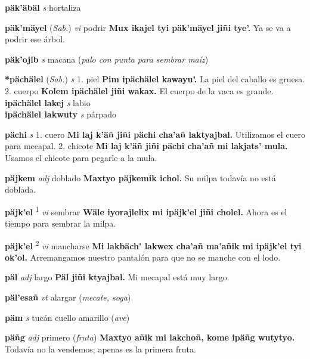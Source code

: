 \documentclass[10pt]{scrbook}
\newcommand{\entry}[1]{\textbf{#1}}
\newcommand{\onedefinition}[1]{#1.}
\newcommand{\defsuperscript}[1]{\textsuperscript{#1}}
\newcommand{\partofspeech}[1]{\textit{#1}}
\newcommand{\spanishtranslation}[1]{#1}
\newcommand{\clarification}[1]{(\textit{#1})}
\newcommand{\cholexample}[1]{\textbf{#1}}
\newcommand{\exampletranslation}[1]{#1}
\newcommand{\relevantdialect}[1]{(\textit{#1})}
\newcommand{\secondaryentry}[1]{\\\textbf{#1}}
\newcommand{\secondpartofspeech}[1]{\textit{#1}}
\newcommand{\secondtranslation}[1]{#1}
\begin{document}
\begin{multicols}{2}
\entry{päk'äbäl}
\partofspeech{s}
\spanishtranslation{hortaliza}

\entry{päk'mäyel}
\relevantdialect{Sab.}
\partofspeech{vi}
\spanishtranslation{podrir}
\cholexample{Mux ikajel tyi päk'mäyel jiñi tye'.}
\exampletranslation{Ya se va a podrir ese árbol.}

\entry{päk'ojib}
\partofspeech{s}
\spanishtranslation{macana}
\clarification{palo con punta para sembrar maíz}

\entry{*pächälel}
\relevantdialect{Sab.}
\partofspeech{s}
\onedefinition{1}
\spanishtranslation{piel}
\cholexample{Pim ipächälel kawayu'.}
\exampletranslation{La piel del caballo es gruesa.}
\onedefinition{2}
\spanishtranslation{cuerpo}
\cholexample{Kolem ipächälel jiñi wakax.}
\exampletranslation{El cuerpo de la vaca es grande.}
\secondaryentry{ipächälel lakej}
\secondpartofspeech{s}
\secondtranslation{labio}
\secondaryentry{ipächälel lakwuty}
\secondpartofspeech{s}
\secondtranslation{párpado}

\entry{pächi}
\partofspeech{s}
\onedefinition{1}
\spanishtranslation{cuero}
\cholexample{Mi laj k'äñ jiñi pächi cha'añ laktyajbal.}
\exampletranslation{Utilizamos el cuero para mecapal.}
\onedefinition{2}
\spanishtranslation{chicote}
\cholexample{Mi laj k'äñ jiñi pächi cha'añ mi lakjats' mula.}
\exampletranslation{Usamos el chicote para pegarle a la mula.}

\entry{päjkem}
\partofspeech{adj}
\spanishtranslation{doblado}
\cholexample{Maxtyo päjkemik ichol.}
\exampletranslation{Su milpa todavía no está doblada.}

\entry{päjk'el}
\defsuperscript{1}
\partofspeech{vi}
\spanishtranslation{sembrar}
\cholexample{Wäle iyorajlelix mi ipäjk'el jiñi cholel.}
\exampletranslation{Ahora es el tiempo para sembrar la milpa.}

\entry{päjk'el}
\defsuperscript{2}
\partofspeech{vi}
\spanishtranslation{mancharse}
\cholexample{Mi lakbäch' lakwex cha'añ ma'añik mi ipäjk'el tyi ok'ol.}
\exampletranslation{Arremangamos nuestro pantalón para que no se manche con el lodo.}

\entry{päl}
\partofspeech{adj}
\spanishtranslation{largo}
\cholexample{Päl jiñi ktyajbal.}
\exampletranslation{Mi mecapal está muy largo.}

\entry{päl'esañ}
\partofspeech{vt}
\spanishtranslation{alargar}
\clarification{mecate, soga}

\entry{päm}
\partofspeech{s}
\spanishtranslation{tucán cuello amarillo}
\clarification{ave}

\entry{päñg}
\partofspeech{adj}
\spanishtranslation{primero}
\clarification{fruta}
\cholexample{Maxtyo añik mi lakchoñ, kome ipäñg wutytyo.}
\exampletranslation{Todavía no la vendemos; apenas es la primera fruta.}


\end{multicols}
\end{document}
